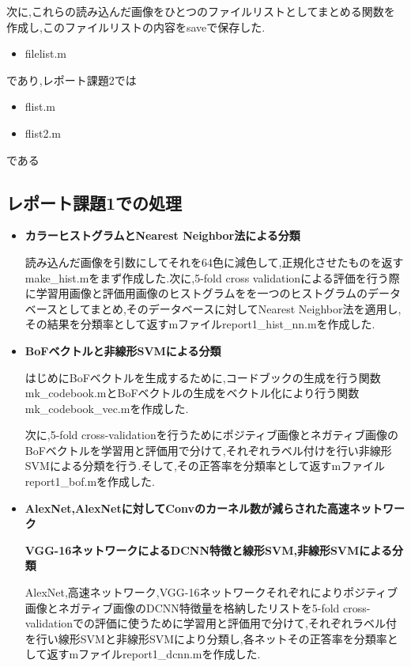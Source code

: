 \documentclass[11pt,a4j]{jreport}
\begin{document}
次に,これらの読み込んだ画像をひとつのファイルリストとしてまとめる関数を作成し,このファイルリストの内容をsaveで保存した.
\begin{itemize}
\item filelist.m
\end{itemize}
であり,レポート課題2では
\begin{itemize}
 \item flist.m
 \item flist2.m
\end{itemize}
である

\subsection{レポート課題1での処理}
\begin{itemize}
\item \textbf{カラーヒストグラムとNearest Neighbor法による分類}


読み込んだ画像を引数にしてそれを64色に減色して,正規化させたものを返すmake\_hist.mをまず作成した.次に,5-fold cross validationによる評価を行う際に学習用画像と評価用画像のヒストグラムをを一つのヒストグラムのデータベースとしてまとめ,そのデータベースに対してNearest Neighbor法を適用し,その結果を分類率として返すmファイルreport1\_hist\_nn.mを作成した.\\

\item \textbf{BoFベクトルと非線形SVMによる分類}


はじめにBoFベクトルを生成するために,コードブックの生成を行う関数mk\_codebook.mとBoFベクトルの生成をベクトル化により行う関数mk\_codebook\_vec.mを作成した.

次に,5-fold cross-validationを行うためにポジティブ画像とネガティブ画像のBoFベクトルを学習用と評価用で分けて,それぞれラベル付けを行い非線形SVMによる分類を行う.そして,その正答率を分類率として返すmファイルreport1\_bof.mを作成した.\\

\item \textbf{AlexNet,AlexNetに対してConvのカーネル数が減らされた高速ネットワーク}
  
      \textbf{VGG-16ネットワークによるDCNN特徴と線形SVM,非線形SVMによる分類}
   

AlexNet,高速ネットワーク,VGG-16ネットワークそれぞれによりポジティブ画像とネガティブ画像のDCNN特徴量を格納したリストを5-fold cross-validationでの評価に使うために学習用と評価用で分けて,それぞれラベル付を行い線形SVMと非線形SVMにより分類し,各ネットその正答率を分類率として返すmファイルreport1\_dcnn.mを作成した.\\


\end{itemize}
\end{document}
